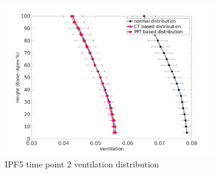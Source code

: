 \begin{figure}[htbp]  
\centering
\begin{subfigure}{.6\linewidth}%
  \includegraphics[width=\linewidth,trim={{.0\wd0} {.0\wd0} {.0\wd0} {.0\wd0}},clip]{Appendix/Image_AppexB/IPF501/IPF501_VentilationAgainstLungHeight.png} %
  \caption{IPF5 time point 2 ventilation distribution}
  \label{fig:VQDistribution-a} 
\end{subfigure} 
\begin{subfigure}{.6\linewidth}%

\end{subfigure}
\end{figure}
